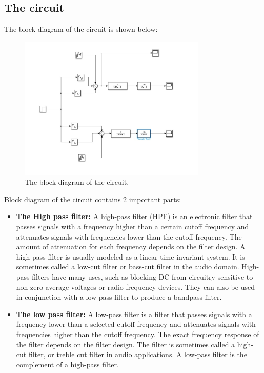\subsection{The circuit}
The block diagram of the circuit is shown below:
\begin{figure}[H]
    \centering
    \includegraphics[width=0.8\textwidth]{../Report/Figures/2.CircuitDesign/BlockDiagram.jpg}
    \caption{The block diagram of the circuit.}
\end{figure}
Block diagram of the circuit contains 2 important parts:
\begin{itemize}
    \item \textbf{The High pass filter:} A high-pass filter (HPF) is an electronic filter that passes signals with a frequency higher than a certain cutoff frequency and attenuates signals with frequencies lower than the cutoff frequency. The amount of attenuation for each frequency depends on the filter design. A high-pass filter is usually modeled as a linear time-invariant system. It is sometimes called a low-cut filter or bass-cut filter in the audio domain. High-pass filters have many uses, such as blocking DC from circuitry sensitive to non-zero average voltages or radio frequency devices. They can also be used in conjunction with a low-pass filter to produce a bandpass filter.
    \item \textbf{The low pass filter:} A low-pass filter is a filter that passes signals with a frequency lower than a selected cutoff frequency and attenuates signals with frequencies higher than the cutoff frequency. The exact frequency response of the filter depends on the filter design. The filter is sometimes called a high-cut filter, or treble cut filter in audio applications. A low-pass filter is the complement of a high-pass filter.
\end{itemize}
